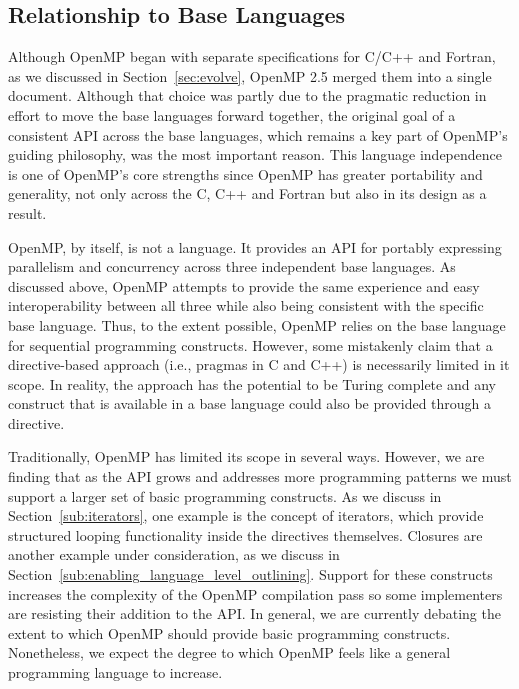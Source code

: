 \subsection{Relationship to Base Languages}
\label{sub:relationship_to_base_languages}

Although OpenMP began with separate specifications for C/C++ and 
Fortran, as we discussed in Section~\ref{sec:evolve}, OpenMP 2.5 
merged them into a single document. Although that choice was
partly due to the pragmatic reduction in effort to move the base 
languages forward together, the original goal of a consistent API 
across the base languages, which remains a key part of OpenMP's 
guiding philosophy, was the most important reason. This language 
independence is one of OpenMP's core strengths since OpenMP has 
greater portability and generality, not only across the C, C++ 
and Fortran but also in its design as a result. 



OpenMP, by itself, is not a language.  It provides an API for portably
expressing parallelism and concurrency across three independent base languages.
As discussed above, OpenMP attempts to provide the same experience and easy
interoperability between all three while also being consistent with the specific
base language. Thus, to the extent possible, OpenMP relies on the base language
for sequential programming constructs. However, some mistakenly claim that a
directive-based approach (i.e., pragmas in C and C++) is necessarily limited in
it scope. In reality, the approach has the potential to be Turing complete and
any construct that is available in a base language could also be provided
through a directive. 

Traditionally, OpenMP has limited its scope in several ways. However, we 
are finding that as the API grows and addresses more programming patterns
we must support a larger set of basic programming constructs. As we
discuss in Section~\ref{sub:iterators}, one example is the concept of 
iterators, which provide structured looping functionality inside the directives
themselves. Closures are another example under consideration, as we discuss in
Section~\ref{sub:enabling_language_level_outlining}. Support for these
constructs increases the complexity of the OpenMP compilation pass so some
implementers are resisting their addition to the API. In general, we are
currently debating the extent to which OpenMP should provide basic programming
constructs. Nonetheless, we expect the degree to which OpenMP feels like a
general programming language to increase.

